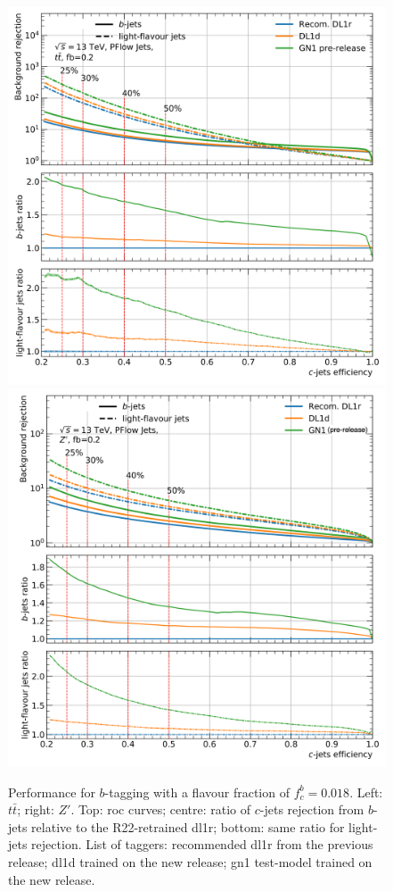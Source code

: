 \begin{center}
\begin{figure}[h!]
{}
\caption{Performance for $b$-tagging with a flavour fraction of $f^b_c = 0.018$. Left: $t\bar{t}$; right: $Z'$. Top: \gls{roc} curves; centre: ratio of $c$-jets rejection from $b$-jets relative to the R22-retrained \gls{dl1r}; bottom: same ratio for light-jets rejection. List of taggers: {\color{blue} recommended \gls{dl1r} from the previous release}; {\color{orange} \gls{dl1d} trained on the new release}; {\color{greenforest} \gls{gn1} test-model trained on the new release}.}
\label{fig:DL1dtt}
\bigskip
\centerline{
\includegraphics[scale=0.45]{Images/FTAG/DL1d/ROC/ttc.png}
\includegraphics[scale=0.45]{Images/FTAG/DL1d/ROC/zpc.png}
}
\end{figure}
\end{center}
